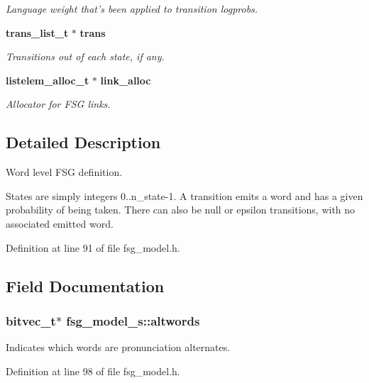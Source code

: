 \begin{DoxyCompactItemize}
\begin{DoxyCompactList}\small\item\em \-Language weight that's been applied to transition logprobs. \end{DoxyCompactList}\item 
{\bf trans\-\_\-list\-\_\-t} $\ast$ {\bf trans}
\begin{DoxyCompactList}\small\item\em \-Transitions out of each state, if any. \end{DoxyCompactList}\item 
{\bf listelem\-\_\-alloc\-\_\-t} $\ast$ {\bf link\-\_\-alloc}
\begin{DoxyCompactList}\small\item\em \-Allocator for \-F\-S\-G links. \end{DoxyCompactList}\end{DoxyCompactItemize}


\subsection{\-Detailed \-Description}
\-Word level \-F\-S\-G definition. 

\-States are simply integers 0..n\-\_\-state-\/1. \-A transition emits a word and has a given probability of being taken. \-There can also be null or epsilon transitions, with no associated emitted word. 

\-Definition at line 91 of file fsg\-\_\-model.\-h.



\subsection{\-Field \-Documentation}
\subsubsection[{altwords}]{\setlength{\rightskip}{0pt plus 5cm}bitvec\-\_\-t$\ast$ {\bf fsg\-\_\-model\-\_\-s\-::altwords}}\label{structfsg__model__s_adb51d840853d7ef3315bd833cddeb748}


\-Indicates which words are pronunciation alternates. 



\-Definition at line 98 of file fsg\-\_\-model.\-h.

